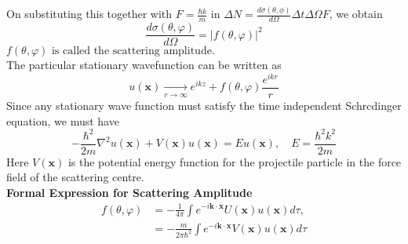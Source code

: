 On substituting this together with $F=\frac{\hbar k}{m}$ in $ \Delta N=\frac{d\sigma(\theta,\phi)}{d\Omega}\Delta t \Delta \Omega F$, we obtain\\
$$\frac{d \sigma(\theta, \varphi)}{d \Omega}=|f(\theta, \varphi)|^{2}$$
\textbf{$f(\theta, \varphi) \text { is called the scattering amplitude. }$}\\
The particular stationary  wavefunction can be written as \\
$$u(\mathbf{x}) \underset{r \rightarrow \infty}{\longrightarrow} e^{i k z}+f(\theta, \varphi) \frac{e^{i k r}}{r}$$
Since any stationary wave function must satisfy the time independent Schrcdinger equation, we must have
$$
-\frac{\hbar^{2}}{2 m} \nabla^{2} u(\mathbf{x})+V(\mathbf{x}) u(\mathbf{x})=E u(\mathbf{x}), \quad E=\frac{\hbar^{2} k^{2}}{2 m}
$$
Here $V(\mathbf{x})$ is the potential energy function for the projectile particle in the force field of the scattering centre. \\
\textbf{Formal Expression for Scattering Amplitude}
$$\begin{aligned}
	f(\theta, \varphi) &=-\frac{1}{4 \pi} \int e^{-i \mathbf{k} \cdot \mathbf{x}} U(\mathbf{x}) u(\mathbf{x}) d \tau, \\
	&=-\frac{m}{2 \pi \hbar^{2}} \int e^{-i \mathbf{k} \cdot \mathbf{x}} V(\mathbf{x}) u(\mathbf{x}) d \tau
\end{aligned}$$
